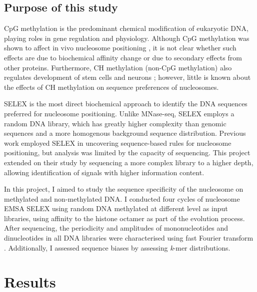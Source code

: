 \documentclass[parskip=full, numbers=noenddot]{scrbook}
\begin{document}
\subsection{Purpose of this study}
\label{ssec:emsaselex_intro_why}

CpG methylation is the predominant chemical modification of eukaryotic DNA, playing roles in gene regulation and physiology. Although CpG methylation was shown to affect in vivo nucleosome positioning \citep{kelly_genome-wide_2012}, it is not clear whether such effects are due to biochemical affinity change or due to secondary effects from other proteins.  Furthermore, CH methylation (non-CpG methylation) also regulates development of stem cells and neurons \citep{guo_distribution_2014}; however, little is known about the effects of CH methylation on sequence preferences of nucleosomes.

SELEX is the most direct biochemical approach to identify the DNA sequences preferred for nucleosome positioning.  Unlike MNase-seq, SELEX employs a random DNA library, which has greatly higher complexity than genomic sequences and a more homogenous background sequence distribution.  Previous work \citep{lowary_new_1998} employed SELEX in uncovering sequence-based rules for nucleosome positioning, but analysis was limited by the capacity of sequencing.  This project extended on their study by sequencing a more complex library to a higher depth, allowing identification of signals with higher information content.

In this project, I aimed to study the sequence specificity of the nucleosome on methylated and non-methylated DNA.  I conducted four cycles of nucleosome EMSA SELEX using random DNA methylated at different level as input libraries, using affinity to the histone octamer as part of the evolution process.  After sequencing, the periodicity and amplitudes of mononucleotides and dinucleotides in all DNA libraries were characterised using fast Fourier transform \citep{lowary_new_1998, zhu_interaction_2018}.  Additionally, I assessed sequence biases by assessing \emph{k}-mer distributions.

\section{Results}
\label{sec:emsaselex_results}
\end{document}
